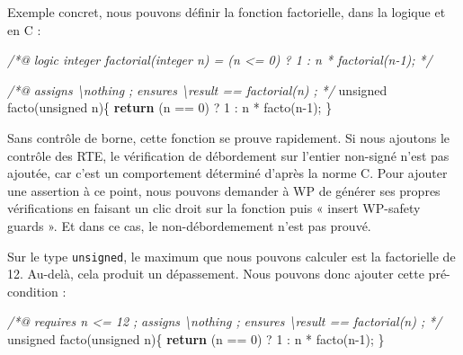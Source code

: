 \documentclass[12pt,francais,]{scrbook}
\newenvironment{Shaded}{}{}
\newcommand{\KeywordTok}[1]{\textcolor[rgb]{0.00,0.44,0.13}{\textbf{{#1}}}}
\newcommand{\DataTypeTok}[1]{\textcolor[rgb]{0.56,0.13,0.00}{{#1}}}
\newcommand{\DecValTok}[1]{\textcolor[rgb]{0.25,0.63,0.44}{{#1}}}
\newcommand{\CommentTok}[1]{\textcolor[rgb]{0.38,0.63,0.69}{\textit{{#1}}}}
\newcommand{\NormalTok}[1]{{#1}}
\begin{document}
Exemple concret, nous pouvons définir la fonction factorielle, dans la
logique et en C :

\begin{footnotesize}\begin{Shaded}
\begin{Highlighting}[]
\CommentTok{/*@}
\CommentTok{  logic integer factorial(integer n) = (n <= 0) ? 1 : n * factorial(n-1);}
\CommentTok{*/}

\CommentTok{/*@ }
\CommentTok{  assigns \textbackslash{}nothing ;}
\CommentTok{  ensures \textbackslash{}result == factorial(n) ; }
\CommentTok{*/}
\DataTypeTok{unsigned} \NormalTok{facto(}\DataTypeTok{unsigned} \NormalTok{n)\{}
  \KeywordTok{return} \NormalTok{(n == }\DecValTok{0}\NormalTok{) ? }\DecValTok{1} \NormalTok{: n * facto(n}\DecValTok{-1}\NormalTok{);}
\NormalTok{\}}
\end{Highlighting}
\end{Shaded}\end{footnotesize}

Sans contrôle de borne, cette fonction se prouve rapidement. Si nous
ajoutons le contrôle des RTE, le vérification de débordement sur
l'entier non-signé n'est pas ajoutée, car c'est un comportement
déterminé d'après la norme C. Pour ajouter une assertion à ce point,
nous pouvons demander à WP de générer ses propres vérifications en
faisant un clic droit sur la fonction puis « insert WP-safety guards ».
Et dans ce cas, le non-débordemement n'est pas prouvé.

Sur le type \texttt{unsigned}, le maximum que nous pouvons calculer est
la factorielle de 12. Au-delà, cela produit un dépassement. Nous pouvons
donc ajouter cette pré-condition :

\clearpage

\begin{footnotesize}\begin{Shaded}
\begin{Highlighting}[]
\CommentTok{/*@ }
\CommentTok{  requires n <= 12 ;}
\CommentTok{  assigns \textbackslash{}nothing ;}
\CommentTok{  ensures \textbackslash{}result == factorial(n) ; }
\CommentTok{*/}
\DataTypeTok{unsigned} \NormalTok{facto(}\DataTypeTok{unsigned} \NormalTok{n)\{}
  \KeywordTok{return} \NormalTok{(n == }\DecValTok{0}\NormalTok{) ? }\DecValTok{1} \NormalTok{: n * facto(n}\DecValTok{-1}\NormalTok{);}
\NormalTok{\}}
\end{Highlighting}
\end{Shaded}\end{footnotesize}
\end{document}

